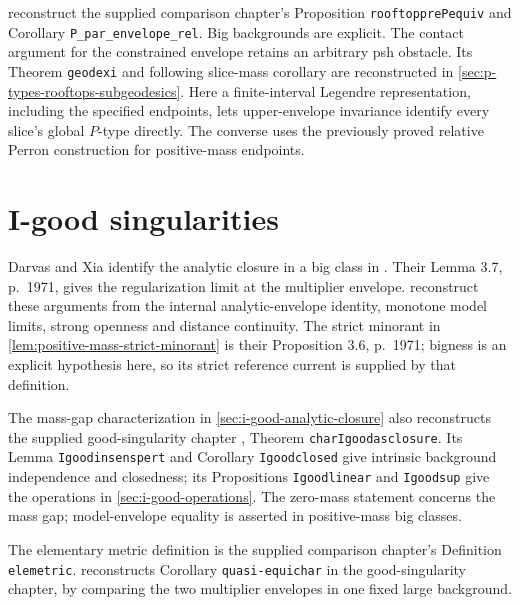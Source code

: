  reconstruct the supplied comparison chapter's Proposition \texttt{rooftopprePequiv} and Corollary \texttt{P\_par\_envelope\_rel}. Big backgrounds are explicit. The contact argument for the constrained envelope retains an arbitrary psh obstacle. Its Theorem \texttt{geodexi} and following slice-mass corollary are reconstructed in \cref{sec:p-types-rooftops-subgeodesics}. Here a finite-interval Legendre representation, including the specified endpoints, lets upper-envelope invariance identify every slice's global $P$-type directly. The converse uses the previously proved relative Perron construction for positive-mass endpoints.

\section{I-good singularities}\label{sec:history-i-good-singularities}
Darvas and Xia identify the analytic closure in a big class in \cite[Theorem 3.8, pp.~1971--1972]{DX21}. Their Lemma 3.7, p.~1971, gives the regularization limit at the multiplier envelope.  reconstruct these arguments from the internal analytic-envelope identity, monotone model limits, strong openness and distance continuity. The strict minorant in \cref{lem:positive-mass-strict-minorant} is their Proposition 3.6, p.~1971; bigness is an explicit hypothesis here, so its strict reference current is supplied by that definition.

The mass-gap characterization in \cref{sec:i-good-analytic-closure} also reconstructs the supplied good-singularity chapter \cite{XiaSampleBook}, Theorem \texttt{charIgoodasclosure}. Its Lemma \texttt{Igoodinsenspert} and Corollary \texttt{Igoodclosed} give intrinsic background independence and closedness; its Propositions \texttt{Igoodlinear} and \texttt{Igoodsup} give the operations in \cref{sec:i-good-operations}. The zero-mass statement concerns the mass gap; model-envelope equality is asserted in positive-mass big classes.

The elementary metric definition is the supplied comparison chapter's Definition \texttt{elemetric}.  reconstructs Corollary \texttt{quasi-equichar} in the good-singularity chapter, by comparing the two multiplier envelopes in one fixed large background.

